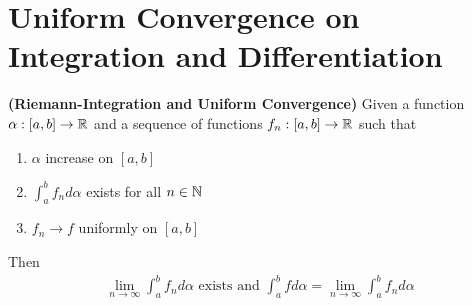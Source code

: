 \documentclass{report}
\begin{document}
\section{Uniform Convergence on Integration and Differentiation}
\begin{theorem}
\label{RIFac}
\textbf{(Riemann-Integration and Uniform Convergence)} Given a function $\alpha :[a,b]\rightarrow \mathbb{R}$ and a sequence of functions $f_n:[a,b]\rightarrow \mathbb{R}$ such that 
\begin{enumerate}[label=(\alph*)]
  \item $\alpha $ increase on $[a,b]$ 
  \item $\int_a^b f_nd\alpha $ exists for all $n\in\mathbb{N}$ 
  \item $f_n \to f $ uniformly on $[a,b]$ 
\end{enumerate}
Then 
\begin{align*}
  \lim_{n\to \infty}\int_a^b f_n d\alpha \text{ exists and }\int_a^b fd\alpha =\lim_{n\to \infty}\int_a^b f_nd\alpha 
\end{align*}
\end{theorem}
\end{document}
